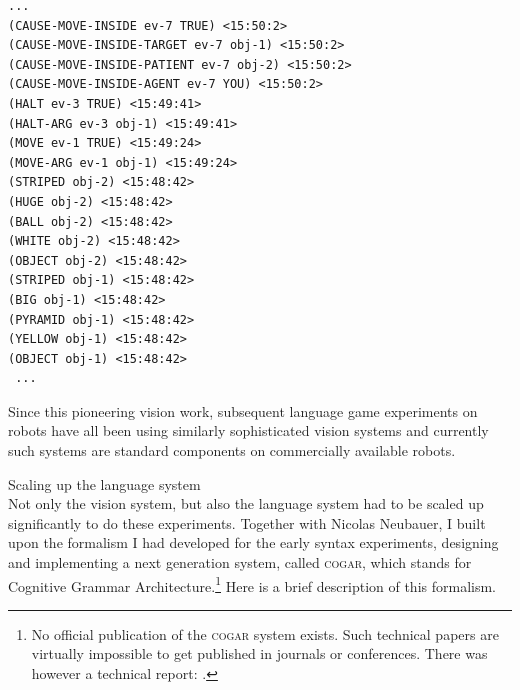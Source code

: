 \begin{verbatim}
... 
(CAUSE-MOVE-INSIDE ev-7 TRUE) <15:50:2>
(CAUSE-MOVE-INSIDE-TARGET ev-7 obj-1) <15:50:2>
(CAUSE-MOVE-INSIDE-PATIENT ev-7 obj-2) <15:50:2>
(CAUSE-MOVE-INSIDE-AGENT ev-7 YOU) <15:50:2>
(HALT ev-3 TRUE) <15:49:41>
(HALT-ARG ev-3 obj-1) <15:49:41>
(MOVE ev-1 TRUE) <15:49:24>
(MOVE-ARG ev-1 obj-1) <15:49:24>
(STRIPED obj-2) <15:48:42>
(HUGE obj-2) <15:48:42>
(BALL obj-2) <15:48:42>
(WHITE obj-2) <15:48:42>
(OBJECT obj-2) <15:48:42>
(STRIPED obj-1) <15:48:42>
(BIG obj-1) <15:48:42>
(PYRAMID obj-1) <15:48:42>
(YELLOW obj-1) <15:48:42>
(OBJECT obj-1) <15:48:42>
 ...
\end{verbatim}

Since this pioneering vision work, subsequent language game experiments on robots have all been using 
similarly sophisticated vision systems and currently such systems are standard components on commercially available
robots. 

{\bfshape  Scaling up the language system}\\

Not only the vision system, but also the language system had to be scaled up significantly to do these experiments. 
Together with Nicolas Neubauer, I built upon the formalism I had developed for the early syntax experiments, 
designing and implementing a next generation system, called \textsc{cogar},  which stands for 
Cognitive Grammar Architecture.\footnote{
No official publication of the \textsc{cogar} system exists. Such technical papers are virtually impossible to get 
published in journals or conferences. There was however a technical report: \cite{Steels:2001}.}
Here is a brief description of this formalism. 

